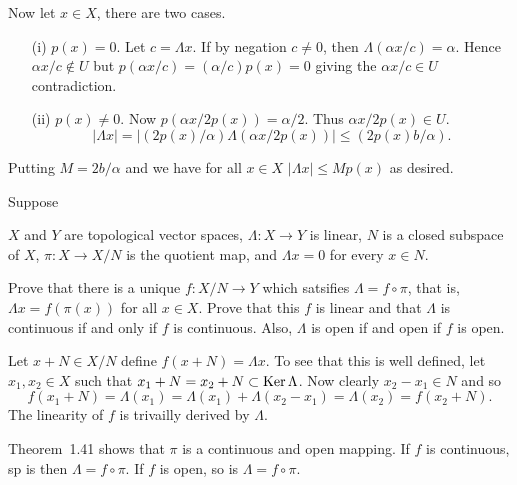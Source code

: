 \begin{enumerate}
\begin{itemize}
  Now let \(x \in X\), there are two cases.
  \begin{itemize}
   \item[(i)]
     \(p(x)=0\).\newline
     Let \(c = \Lambda x\).
     If by negation \(c\neq 0\), then \(\Lambda(\alpha x/c) = \alpha\).
     Hence \(\alpha x/c \notin U\) but \(p(\alpha x/c) = (\alpha/c)p(x) = 0\)
     giving the \(\alpha x/c \in U\) contradiction.
   \item[(ii)]
    \(p(x)\neq 0\).\newline
     Now \(p(\alpha x/2p(x)) = \alpha/2\).
     Thus \(\alpha x/2p(x) \in U\).
     \begin{equation*}
     |\Lambda x| = | (2p(x)/\alpha) \Lambda (\alpha  x/2p(x))| 
      \leq (2p(x)b/\alpha).
     \end{equation*}
   \end{itemize}
   Putting \(M = 2b/\alpha\) and we have for all \(x\in X\)
   \(|\Lambda x| \leq Mp(x)\) as desired.
  
\end{itemize}

\begin{excopy}
Suppose
 \begin{itemize}
   $X$ and $Y$ are topological vector spaces,
   \(\Lambda: X\rightarrow Y\) is linear,
   $N$ is a closed subspace of $X$,
   \(\pi:X \rightarrow X/N\) is the quotient map, and
   \(\Lambda x = 0\) for every \(x\in N\).
 \end{itemize}
Prove that there is a unique \(f:X/N \rightarrow Y\) which satsifies
\(\Lambda = f \circ \pi\), that is,
\(\Lambda x = f(\pi(x))\) for all \(x\in X\).
Prove that this $f$ is linear and that \(\Lambda\) is continuous
if and only if $f$ is continuous. Also, \(\Lambda\) is open if and open if 
$f$ is open.
\end{excopy}

Let \(x+N\in X/N\) define \(f(x+N) = \Lambda x\).
To see that this is well defined, let \(x_1,x_2\in X\)
such that \(x_1 + N = x_2 + N \subset \mathop{\rm Ker}\nolimits \Lambda\).
Now clearly \(x_2 - x_1 \in N\) and so
\begin{equation*}
f(x_1 + N) = \Lambda (x_1) = \Lambda(x_1) + \Lambda(x_2 - x_1) = 
  \Lambda(x_2) = f(x_2 + N).
\end{equation*}
The linearity  of $f$ is trivailly derived by \(\Lambda\).

Theorem~1.41 shows that \(\pi\) is a continuous and open mapping.
If $f$ is continuous, sp is then \(\Lambda = f \circ \pi\).
If $f$ is open, so is \(\Lambda = f \circ \pi\).


\end{enumerate}
